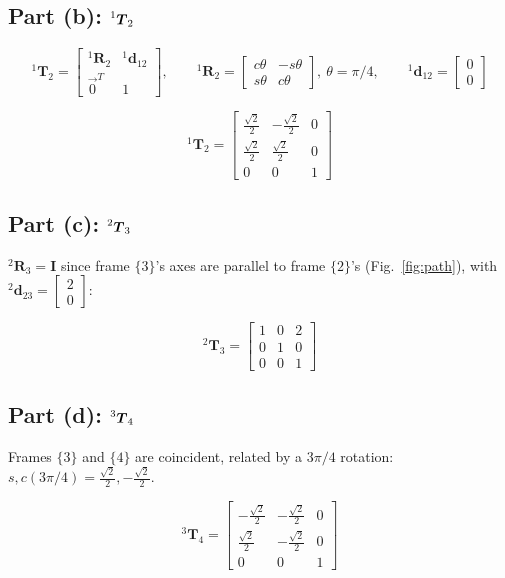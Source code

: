 \documentclass[11pt]{article}
\newcommand{\T}{\bm{T}}
\newcommand{\R}{\bm{R}}
\newcommand{\dvec}{\bm{d}}
\begin{document}
\subsection*{Part (b): $\prescript{1}{}{\T}_{2}$}
\[
    ^{1}\T_2 = \begin{bmatrix}^{1}\R_2 & ^{1}\dvec_{12} \\ \vec 0^{T} & 1\end{bmatrix}, \qquad ^{1}\R_2=\begin{bmatrix}c\theta&-s\theta\\s\theta&c\theta\end{bmatrix},\ \theta=\pi/4, \qquad {}^{1}\dvec_{12}=\begin{bmatrix}0\\0\end{bmatrix}
\]
\begin{result}
\[
    ^{1}\T_2 = \begin{bmatrix}\tfrac{\sqrt2}{2} & -\tfrac{\sqrt2}{2} & 0 \\ \tfrac{\sqrt2}{2} & \tfrac{\sqrt2}{2} & 0 \\ 0 & 0 & 1\end{bmatrix}
\]
\end{result}

\subsection*{Part (c): $\prescript{2}{}{\T}_{3}$}
$^{2}\R_3=\bm I$ since frame $\{3\}$'s axes are parallel to frame $\{2\}$'s (Fig.~\ref{fig:path}), with $^{2}\dvec_{23}=\begin{bmatrix}2\\0\end{bmatrix}$:
\begin{result}
\[
    ^{2}\T_3 = \begin{bmatrix}1 & 0 & 2 \\ 0 & 1 & 0 \\ 0 & 0 & 1\end{bmatrix}
\]
\end{result}

\subsection*{Part (d): $\prescript{3}{}{\T}_{4}$}
Frames $\{3\}$ and $\{4\}$ are coincident, related by a $3\pi/4$ rotation: $s,c(3\pi/4)=\tfrac{\sqrt2}{2},-\tfrac{\sqrt2}{2}$.
\begin{result}
\[
    ^{3}\T_4 = \begin{bmatrix}-\tfrac{\sqrt2}{2} & -\tfrac{\sqrt2}{2} & 0 \\ \tfrac{\sqrt2}{2} & -\tfrac{\sqrt2}{2} & 0 \\ 0 & 0 & 1\end{bmatrix}
\]
\end{result}
\end{document}
